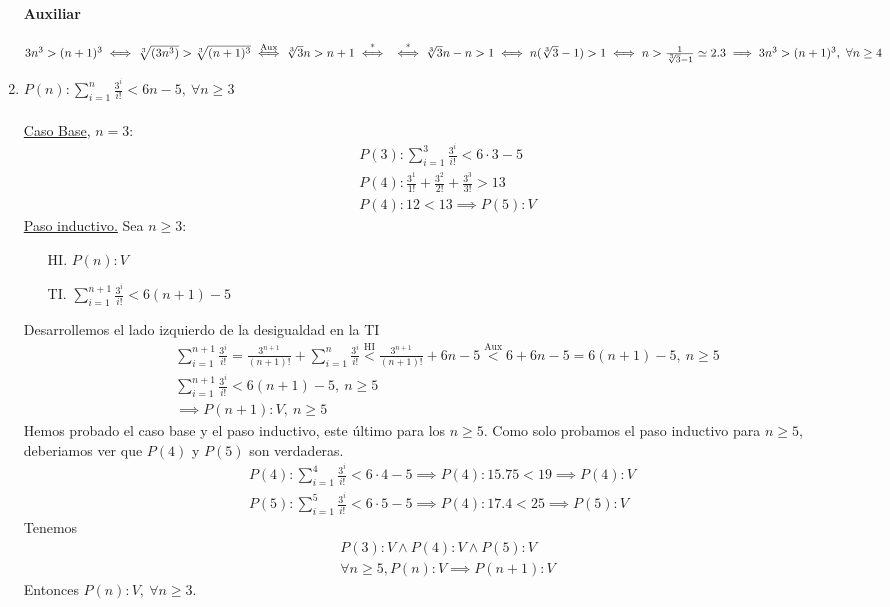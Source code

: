 \begin{enumerate}[label=\roman*)]
	\paragraph{Auxiliar}{$3n^3 > (n+1)^3 \iff \sqrt[3]{(3n^3)} > \sqrt[3]{(n+1)^3} \overset{\text{Aux}}{\iff} 
	\sqrt[3]{3}n > n+1 \overset{\text{*}}{\iff} \\ 
	\overset{\text{*}}{\iff} \sqrt[3]{3}n - n > 1 \iff n(\sqrt[3]{3}-1) > 1 \iff n > \frac{1}{\sqrt[3]{3}-1} \simeq 2.3 
	\implies 3n^3 > (n+1)^3, \ \forall n \geq 4$}

	\item $P(n):\displaystyle \sum_{i=1}^{n}\frac{3^i}{i!} < 6n - 5, \ \forall n \geq 3$ \\ \\
	\underline{Caso Base}, $n = 3$:
	\begin{align*}
		&P(3): \sum_{i=1}^{3}\frac{3^i}{i!} < 6 \cdot 3 - 5 \\
		&P(4): \frac{3^1}{1!} + \frac{3^2}{2!} + \frac{3^3}{3!} > 13 \\
		&P(4): 12 < 13 \implies P(5):V
	\end{align*}
	\underline{Paso inductivo.} Sea $n \geq 3$:
	\begin{enumerate}
    \item[HI.] $P(n): V$
    \item[TI.] $\displaystyle \sum_{i=1}^{n+1}\frac{3^i}{i!} < 6(n+1) - 5$
  \end{enumerate}
 	Desarrollemos el lado izquierdo de la desigualdad en la TI
  \begin{align*}
    &\sum_{i=1}^{n+1}\frac{3^i}{i!} = \frac{3^{n+1}}{(n+1)!} + \sum_{i=1}^{n} \frac{3^i}{i!} 
  	\overset{\text{HI}}{<} \frac{3^{n+1}}{(n+1)!} + 6n - 5 \overset{\text{Aux}}{<} 6 + 6n - 5 = 6(n+1) - 5,\ n \geq 5 \\
    &\sum_{i=1}^{n+1}\frac{3^i}{i!} < 6(n+1) - 5, \ n \geq 5\\
    &\implies P(n+1):V, \ n \geq 5
  \end{align*}
  Hemos probado el caso base y el paso inductivo, este último para los $n \geq 5$. Como solo probamos el
  paso inductivo para $n \geq 5$, deberiamos ver que $P(4)$ y $P(5)$ son verdaderas.
  \begin{align*}
    P(4): \sum_{i=1}^{4}\frac{3^i}{i!} < 6 \cdot 4 - 5 \implies P(4): 15.75 < 19 \implies P(4):V \\
    P(5): \sum_{i=1}^{5}\frac{3^i}{i!} < 6 \cdot 5 - 5 \implies P(4): 17.4 < 25 \implies P(5):V
  \end{align*}
  Tenemos
  \begin{align*}
  &P(3):V \land P(4):V \land P(5):V \\
  &\forall n \geq 5, P(n):V \implies P(n+1):V
  \end{align*}
  Entonces $P(n):V, \ \forall n \geq 3$.


\end{enumerate}
